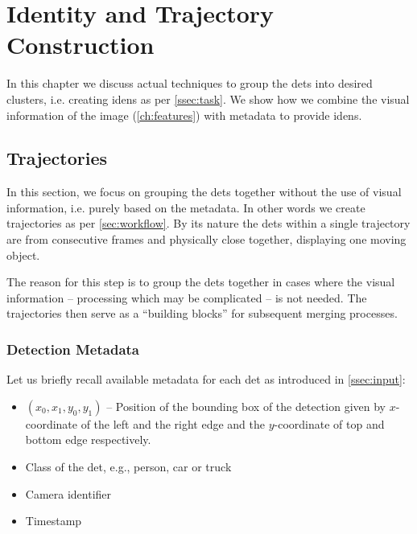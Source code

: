 \chapter{Identity and Trajectory Construction}

\label{ch:iden_construction}


In this chapter we discuss actual techniques to group the \glspl{det} into
desired clusters, i.e. creating \glspl{iden} as per \autoref{ssec:task}.
We show how we combine the visual information of the image
(\autoref{ch:features}) with metadata to provide \glspl{iden}.

\section{Trajectories}

In this section, we focus on grouping the \glspl{det} together without the use of visual information, i.e. purely based on the metadata. In other words we create trajectories as per \autoref{sec:workflow}. By its nature the \glspl{det} within a single trajectory are from consecutive frames and physically close together, displaying one moving object.

The reason for this step is to group the \glspl{det} together in cases
where the visual information -- processing which may be complicated -- is not
needed. The trajectories then serve as a ``building blocks'' for subsequent merging
processes.



\subsection{Detection Metadata}

Let us briefly recall available metadata for each \gls{det} as introduced in
\autoref{ssec:input}:

\begin{itemize}
    \item $(x_0, x_1, y_0, y_1)$ -- Position of the bounding box of the detection given by $x$-coordinate of the left and the right edge and the $y$-coordinate of top and bottom edge respectively.
    \item Class of the \gls{det}, e.g., person, car or truck
    \item Camera identifier
    \item Timestamp
\end{itemize}

